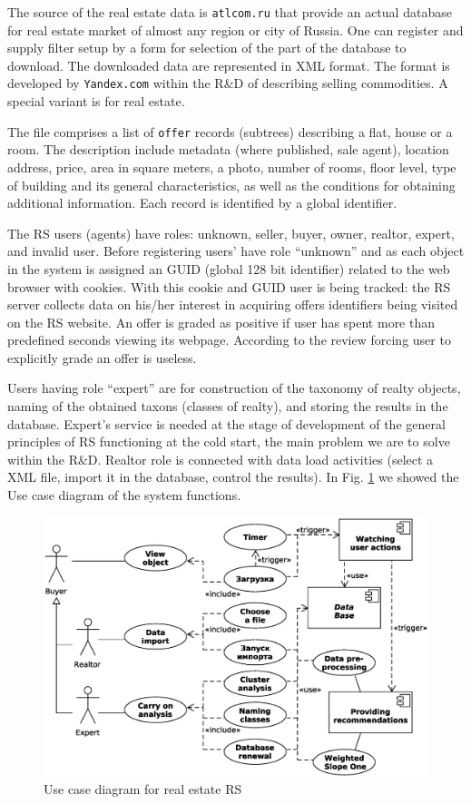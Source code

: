 \documentclass[conference]{IEEEtran}
\begin{document}
The source of the real estate data is \texttt{atlcom.ru} that provide an actual database for real estate market of almost any region or city of Russia.  One can register and supply filter setup by a form for selection of the part of the database to download. The downloaded data are represented in XML format.  The format is developed by \texttt{Yandex.com} within the R\&D of describing selling commodities.  A special variant is for real estate.

The file comprises a list of \texttt{offer} records (subtrees) describing a flat, house or a room.  The description include metadata (where published, sale agent), location address, price, area in square meters, a photo, number of rooms, floor level, type of building and its general characteristics, as well as the conditions for obtaining additional information.  Each record is identified by a global identifier.

The RS users (agents) have roles: unknown, seller, buyer, owner, realtor, expert, and invalid user.  Before registering users' have role ``unknown'' and as each object in the system is assigned an GUID (global 128 bit identifier) related to the web browser with cookies.  With this cookie and GUID user is being tracked: the RS server collects data on his/her interest in acquiring offers identifiers being visited on the RS website.  An offer is graded as positive if user has spent more than predefined seconds viewing its webpage.  According to the review \cite{br13} forcing user to explicitly grade an offer is useless.

Users having role ``expert'' are for construction of the taxonomy of realty objects, naming of the obtained taxons (classes of realty), and storing the results in the database.  Expert's service is needed at the stage of development of the general principles of RS functioning at the cold start, the main problem we are to solve within the R\&D.  Realtor role is connected with data load activities (select a XML file, import it in the database, control the results).  In Fig. \ref{fig:use-case} we showed the Use case diagram of the system functions.

\begin{figure}[tb]
  \centering
  \includegraphics[width=\linewidth]{use_case.eps}
  \caption{Use case diagram for real estate RS}
  \label{fig:use-case}
\end{figure}
\end{document}

